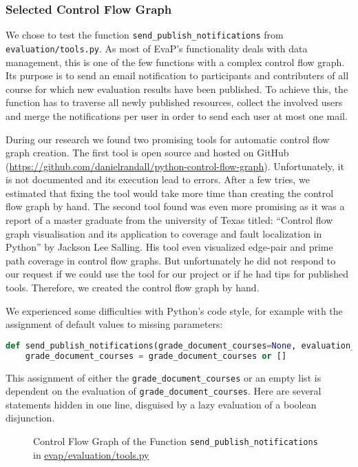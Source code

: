 \usetikzlibrary{arrows,automata}

\subsubsection{Selected Control Flow Graph}
We chose to test the function \texttt{send\_publish\_notifications} from \texttt{evaluation/tools.py}.
As most of EvaP's functionality deals with data management, this is one of the few functions with a complex control flow graph.
Its purpose is to send an email notification to participants and contributers of all course for which new evaluation results have been published.
To achieve this, the function has to traverse all newly published resources, collect the involved users and merge the notifications per user in order to send each user at most one mail.

During our research we found two promising tools for automatic control flow graph creation. 
The first tool is open source and hosted on GitHub (\url{https://github.com/danielrandall/python-control-flow-graph}). 
Unfortunately, it is not documented and its execution lead to errors. 
After a few tries, we estimated that fixing the tool would take more time than creating the control flow graph by hand.
The second tool found was even more promising as it was a report of a master graduate from the university of Texas titled: 
``Control flow graph visualisation and its application to coverage and fault localization in Python''
by Jackson Lee Salling.
His tool even visualized edge-pair and prime path coverage in control flow graphs.
But unfortunately he did not respond to our request if we could use the tool for our project or if he had tips for published tools.
Therefore, we created the control flow graph by hand.

We experienced some difficulties with Python's code style, for example with the assignment of default values to missing parameters:
\begin{lstlisting}[language=Python, breaklines]
def send_publish_notifications(grade_document_courses=None, evaluation_results_courses=None):
    grade_document_courses = grade_document_courses or []
\end{lstlisting}
This assignment of either the \texttt{grade\_document\_courses} or an empty list is dependent on the evaluation of \texttt{grade\_document\_courses}.
Here are several statements hidden in one line, disguised by a lazy evaluation of a boolean disjunction.




\begin{figure}
\caption{Control Flow Graph of the Function \texttt{send\_publish\_notifications} in \url{evap/evaluation/tools.py}}
\end{figure}

